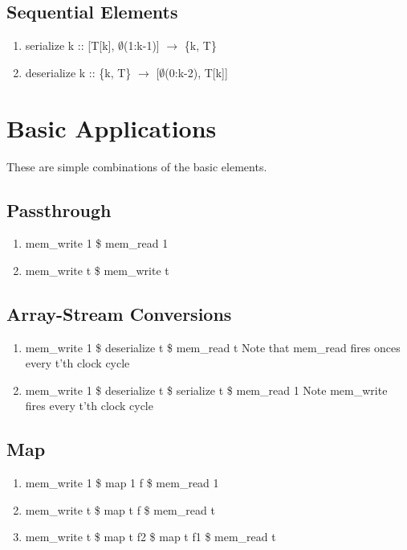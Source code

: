 \documentclass[11pt,fleqn]{article}
\numberwithin{equation}{subsection}
\begin{document}
\subsection{Sequential Elements}

\begin{enumerate}
    \item serialize k :: [T[k], $\emptyset$(1:k-1)] $\rightarrow$ \{k, T\}
    \item deserialize k :: \{k, T\} $\rightarrow$ [$\emptyset$(0:k-2), T[k]]
\end{enumerate}

\section{Basic Applications}
These are simple combinations of the basic elements.

\subsection{Passthrough}
\begin{enumerate}
    \item mem\_write 1 \$ mem\_read 1
    \item mem\_write t \$ mem\_write t 
\end{enumerate}

\subsection{Array-Stream Conversions}
\begin{enumerate}
    \item mem\_write 1 \$ deserialize t \$ mem\_read t
        \subitem Note that mem\_read fires onces every t'th clock cycle
    \item mem\_write 1 \$ deserialize t \$ serialize t \$ mem\_read 1
        \subitem Note mem\_write fires every t'th clock cycle
\end{enumerate}

\subsection{Map}
\begin{enumerate}
    \item mem\_write 1 \$ map 1 f \$ mem\_read 1
    \item mem\_write t \$ map t f \$ mem\_read t
    \item mem\_write t \$ map t f2 \$ map t f1 \$ mem\_read t
\end{enumerate}
\end{document}

